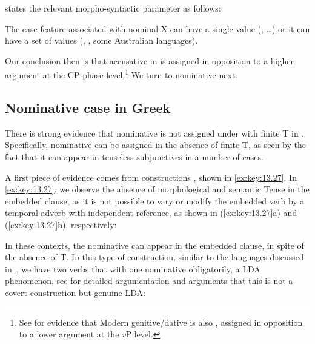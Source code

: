 \documentclass[output=paper]{langsci/langscibook}
\begin{document}
\citet{Baker2015} states the relevant morpho-syntactic parameter as follows:

\ea%
    \label{ex:key:13.26}
    The case feature associated with nominal X can have a single value
    (, \emph{} \dots) or it can have a set of values
    (, , some Australian languages).
\z

Our conclusion then is that accusative in  is  assigned in
opposition to a higher argument at the CP-phase level.\footnote{See
    \citet{AnaSev2016} for evidence that Modern  genitive/dative is also
    , assigned in opposition to a lower argument at the \emph{v}P
level.} We turn to nominative next.

\subsection{Nominative case in Greek}\label{sec:key:13.3.2}

There is strong evidence that nominative is not assigned under  with
finite T in . Specifically, nominative can be assigned in the absence of
finite T, as seen by the fact that it can appear in tenseless subjunctives in a
number of cases.

A first piece of evidence comes from   constructions
\parencite{AleAna1999}, shown in \eqref{ex:key:13.27}. In \eqref{ex:key:13.27},
we observe the absence of morphological and semantic Tense in the embedded
clause, as it is not possible to vary or modify the embedded verb by a temporal
adverb with independent reference, as shown in (\ref{ex:key:13.27}a) and
(\ref{ex:key:13.27}b), respectively:

\ea\label{ex:key:13.27}
    \z
\z

In these contexts, the nominative can appear in the
embedded clause, in spite of the absence of T. In this type of construction,
similar to the languages discussed in~, we have two verbs
that  with one nominative obligatorily, a
\gls{LDA} phenomenon, see \textcite{AleAnaIorMar2012} for detailed
argumentation and arguments that this is not a covert 
construction but genuine \gls{LDA}:
\end{document}
